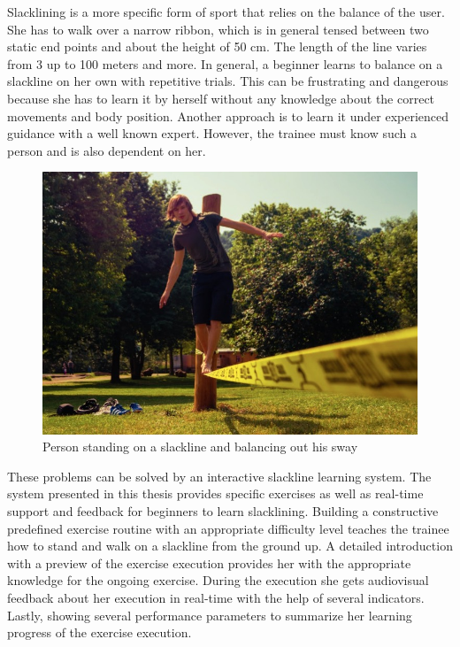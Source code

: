 Slacklining is a more specific form of sport that relies on the balance of the user.
She has to walk over a narrow ribbon, which is in general tensed between two static end points and about the height of 50 cm.
The length of the line varies from 3 up to 100 meters and more.
In general, a beginner learns to balance on a slackline on her own with repetitive trials.
This can be frustrating and dangerous because she has to learn it by herself without any knowledge about the correct movements and body position.
Another approach is to learn it under experienced guidance with a well known expert.
However, the trainee must know such a person and is also dependent on her.
\begin{figure}[htb]
	\centering
	\begin{minipage}[t]{1\linewidth}
		\centering
		\includegraphics[width=0.7\linewidth]{Pictures/1_slackline}
		\caption{Person standing on a slackline and balancing out his sway}
		\label{fig:1_slackline}
	\end{minipage}
\end{figure}

These problems can be solved by an interactive slackline learning system.
The system presented in this thesis provides specific exercises as well as real-time support and feedback for beginners to learn slacklining.
Building a constructive predefined exercise routine with an appropriate difficulty level teaches the trainee how to stand and walk on a slackline from the ground up.
A detailed introduction with a preview of the exercise execution provides her with the appropriate knowledge for the ongoing exercise.
During the execution she gets audiovisual feedback about her execution in real-time with the help of several indicators.
Lastly, showing several performance parameters to summarize her learning progress of the exercise execution.


